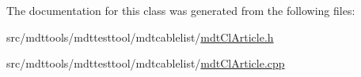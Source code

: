 The documentation for this class was generated from the following files\-:\begin{DoxyCompactItemize}
\item 
src/mdttools/mdttesttool/mdtcablelist/\hyperlink{mdt_cl_article_8h}{mdt\-Cl\-Article.\-h}\item 
src/mdttools/mdttesttool/mdtcablelist/\hyperlink{mdt_cl_article_8cpp}{mdt\-Cl\-Article.\-cpp}\end{DoxyCompactItemize}
